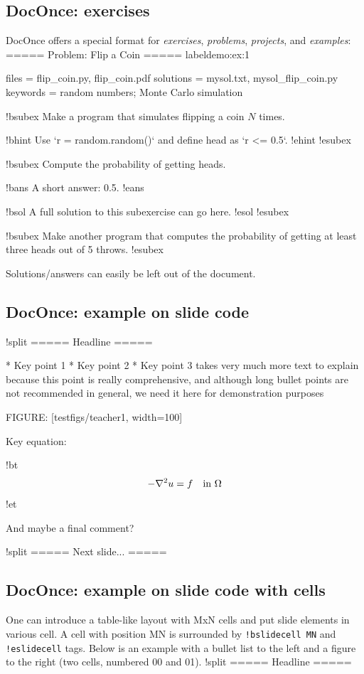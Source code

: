 \documentclass[%
oneside,                 %
final,                   %
10pt]{article}
\begin{document}
\subsection{DocOnce: exercises}
DocOnce offers a special format for \emph{exercises}, \emph{problems}, \emph{projects},
and \emph{examples}:
\bccq
===== Problem: Flip a Coin =====
label{demo:ex:1}

files = flip_coin.py, flip_coin.pdf
solutions = mysol.txt, mysol_flip_coin.py
keywords = random numbers; Monte Carlo simulation

!bsubex
Make a program that simulates flipping a coin $N$ times.

!bhint
Use `r = random.random()` and define head as `r <= 0.5`.
!ehint
!esubex

!bsubex
Compute the probability of getting heads.

!bans
A short answer: 0.5.
!eans

!bsol
A full solution to this subexercise can go here.
!esol
!esubex

!bsubex
Make another program that computes the probability
of getting at least three heads out of 5 throws.
!esubex

\eccq

Solutions/answers can easily be left out of the document.
\subsection{DocOnce: example on slide code}
\bccq
!split
===== Headline =====

 * Key point 1
 * Key point 2
 * Key point 3 takes very much more text to explain because
   this point is really comprehensive, and although long
   bullet points are not recommended in general, we need
   it here for demonstration purposes

FIGURE: [testfigs/teacher1, width=100]

Key equation:

!bt
\[ -\nabla^2 u = f \quad\hbox{in }\Omega \]
!et

And maybe a final comment?

!split
===== Next slide... =====

\eccq

\subsection{DocOnce: example on slide code with cells}
One can introduce a table-like layout with MxN cells and
put slide elements in various cell. A cell with position
MN is surrounded by \Verb?!bslidecell MN? and \Verb?!eslidecell?
tags. Below is an example with a bullet list to the left and
a figure to the right (two cells, numbered 00 and 01).
\bccq
!split
===== Headline =====
\end{document}
